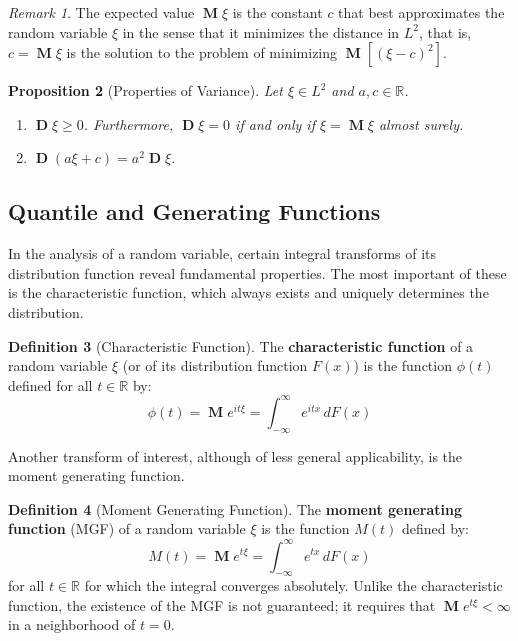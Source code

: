 \documentclass[12pt, openany]{book}
\theoremstyle{definition}
\newtheorem{definition}{Definition}[section]
\theoremstyle{plain}
\newtheorem{proposition}[definition]{Proposition}
\theoremstyle{remark}
\newtheorem{remark}[definition]{Remark}
\newcommand{\R}{\mathbb{R}}
\DeclareMathOperator{\E}{\mathbf{M}} %
\DeclareMathOperator{\M}{\mathbf{M}} %
\DeclareMathOperator{\D}{\mathbf{D}} %
\begin{document}
\begin{remark}
The expected value $\M\xi$ is the constant $c$ that best approximates the random variable $\xi$ in the sense that it minimizes the distance in $L^2$, that is, $c = \M\xi$ is the solution to the problem of minimizing $\M[(\xi-c)^2]$.
\end{remark}

\begin{proposition}[Properties of Variance]
Let $\xi \in L^2$ and $a,c \in \R$.
\begin{enumerate}
    \item $\D\xi \ge 0$. Furthermore, $\D\xi = 0$ if and only if $\xi = \M\xi$ almost surely.
    \item $\D(a\xi + c) = a^2 \D\xi$.
\end{enumerate}
\end{proposition}

\subsection{Quantile and Generating Functions}

In the analysis of a random variable, certain integral transforms of its distribution function reveal fundamental properties. The most important of these is the characteristic function, which always exists and uniquely determines the distribution.

\begin{definition}[Characteristic Function]
The \textbf{characteristic function} of a random variable $\xi$ (or of its distribution function $F(x)$) is the function $\phi(t)$ defined for all $t \in \R$ by:
$$ \phi(t) = \E e^{it\xi} = \int_{-\infty}^{\infty} e^{itx} \,dF(x) $$
\end{definition}

Another transform of interest, although of less general applicability, is the moment generating function.

\begin{definition}[Moment Generating Function]
The \textbf{moment generating function} (MGF) of a random variable $\xi$ is the function $M(t)$ defined by:
$$ M(t) = \E e^{t\xi} = \int_{-\infty}^{\infty} e^{tx} \,dF(x) $$
for all $t \in \R$ for which the integral converges absolutely. Unlike the characteristic function, the existence of the MGF is not guaranteed; it requires that $\E e^{t\xi} < \infty$ in a neighborhood of $t=0$.
\end{definition}
\end{document}
